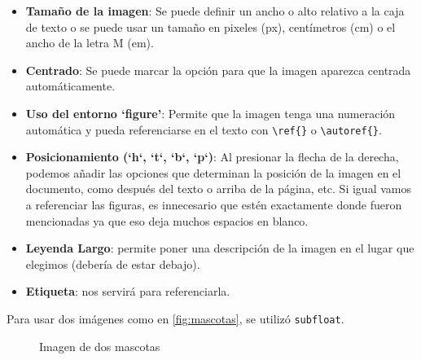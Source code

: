 \begin{itemize}
	\item \textbf{Tamaño de la imagen}: Se puede definir un ancho o alto relativo a la caja de texto o se puede usar un tamaño en pixeles (px), centímetros (cm) o el ancho de la letra M (em).
	\item \textbf{Centrado}: Se puede marcar la opción para que la imagen aparezca centrada automáticamente.
	\item \textbf{Uso del entorno `figure'}: Permite que la imagen tenga una numeración automática y pueda referenciarse en el texto con \texttt{\textbackslash ref\{\}} o \texttt{\textbackslash autoref\{\}}.
	\item \textbf{Posicionamiento (`h`, `t`, `b`, `p`)}: Al presionar la flecha de la derecha, podemos añadir las opciones que determinan la posición de la imagen en el documento, como después del texto o arriba de la página, etc. Si igual vamos a referenciar las figuras, es innecesario que estén exactamente donde fueron mencionadas ya que eso deja muchos espacios en blanco.
	\item \textbf{Leyenda Largo}: permite poner una descripción de la imagen en el lugar que elegimos (debería de estar debajo).
	\item \textbf{Etiqueta}: nos servirá para referenciarla. 
\end{itemize}

Para usar dos imágenes como en \autoref{fig:mascotas}, se utilizó \texttt{subfloat}.
\begin{figure}[h]
	\centering
	\hfill
	\caption{Imagen de dos mascotas}
	\label{fig:mascotas}
\end{figure}